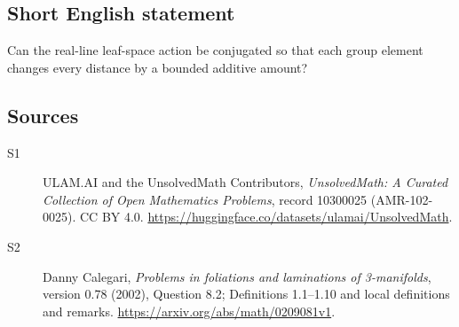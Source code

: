\documentclass[11pt]{article}
\begin{document}
\subsection{Short English statement}
Can the real-line leaf-space action be conjugated so that each group element changes every distance by a bounded additive amount?
\subsection{Sources}
\begin{description}
\item[\hypertarget{source:10300025:1}{S1}] ULAM.AI and the UnsolvedMath Contributors, \emph{UnsolvedMath: A Curated Collection of Open Mathematics Problems}, record 10300025 (AMR-102-0025). CC BY 4.0. \url{https://huggingface.co/datasets/ulamai/UnsolvedMath}.
\item[\hypertarget{source:10300025:2}{S2}] Danny Calegari, \emph{Problems in foliations and laminations of 3-manifolds}, version 0.78 (2002), Question 8.2; Definitions 1.1--1.10 and local definitions and remarks. \url{https://arxiv.org/abs/math/0209081v1}.
\end{description}
\label{end:10300025}
\end{document}
